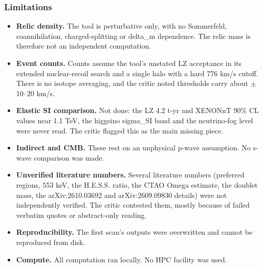 \documentclass[11pt,a4paper]{article}
\begin{document}
\subsubsection*{Limitations}
\begin{itemize}
  \item \textbf{Relic density.} The tool is perturbative only, with no Sommerfeld, coannihilation, charged-splitting or delta\_m dependence. The relic mass is therefore not an independent computation.
  \item \textbf{Event counts.} Counts assume the tool's unstated LZ acceptance in its extended nuclear-recoil search and a single halo with a hard 776 km/s cutoff. There is no isotope averaging, and the critic noted thresholds carry about $\pm$10--20 km/s.
  \item \textbf{Elastic SI comparison.} Not done: the LZ 4.2 t-yr and XENONnT 90\% CL values near 1.1 TeV, the higgsino sigma\_SI band and the neutrino-fog level were never read. The critic flagged this as the main missing piece.
  \item \textbf{Indirect and CMB.} These rest on an unphysical p-wave assumption. No s-wave comparison was made.
  \item \textbf{Unverified literature numbers.} Several literature numbers (preferred regions, 553 keV, the H.E.S.S. ratio, the CTAO Omega estimate, the doublet mass, the arXiv:2610.03692 and arXiv:2609.09830 details) were not independently verified. The critic contested them, mostly because of failed verbatim quotes or abstract-only reading.
  \item \textbf{Reproducibility.} The first scan's outputs were overwritten and cannot be reproduced from disk.
  \item \textbf{Compute.} All computation ran locally. No HPC facility was used.
\end{itemize}
\end{document}
